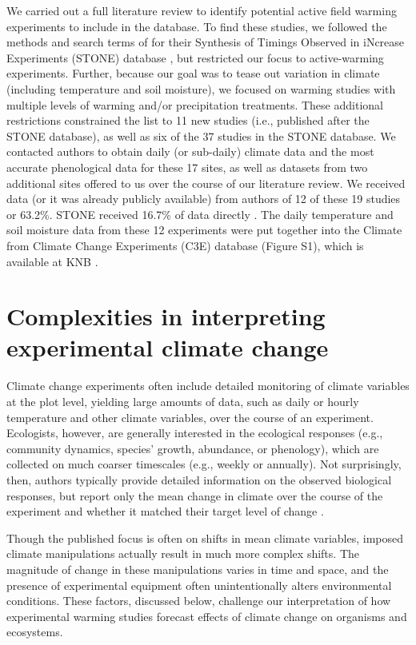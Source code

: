 \documentclass{article}
\begin{document}
\par We carried out a full literature review to identify potential active field warming experiments to include in the database. To find these studies, we followed the methods and search terms of \citet{wolkovich2012} for their Synthesis of Timings Observed in iNcrease Experiments (STONE) database \citep{wolkovich2012}, but restricted our focus to active-warming experiments. Further, because our goal was to tease out variation in climate (including temperature and soil moisture), we focused on warming studies with multiple levels of warming and/or precipitation treatments. These additional restrictions constrained the list to 11 new studies (i.e., published after the STONE database), as well as six of the 37 studies in the STONE database. We contacted authors to obtain daily (or sub-daily) climate data and the most accurate phenological data for these 17 sites, as well as datasets from two additional sites offered to us over the course of our literature review.  We received data (or it was already publicly available) from authors of 12 of these 19 studies or 63.2\%. STONE received 16.7\% of data directly \citep{wolkovich2012}. The daily temperature and soil moisture data from these 12 experiments were put together into the Climate from Climate Change Experiments (C3E) database (Figure S1), which is available at KNB \citep{ettinger2017}.%

\section* {Complexities in interpreting experimental climate change} 
Climate change experiments often include detailed monitoring of climate variables at the plot level, yielding large amounts of data, such as daily or hourly temperature and other climate variables, over the course of an experiment. Ecologists, however, are generally interested in the ecological responses (e.g., community dynamics, species' growth, abundance, or phenology), which are collected on much coarser timescales (e.g., weekly or annually). Not surprisingly, then, authors typically provide detailed information on the observed biological responses, but report only the mean change in climate over the course of the experiment and whether it matched their target level of change \citep[e.g.,][]{price1998,rollinson2012,clark2014a,clark2014b}. 

\par Though the published focus is often on shifts in mean climate variables, imposed climate manipulations actually result in much more complex shifts. The magnitude of change in these manipulations varies in time and space, and the presence of experimental equipment often unintentionally alters environmental conditions. These factors, discussed below, challenge our interpretation of how experimental warming studies forecast effects of climate change on organisms and ecosystems.
\end{document}
